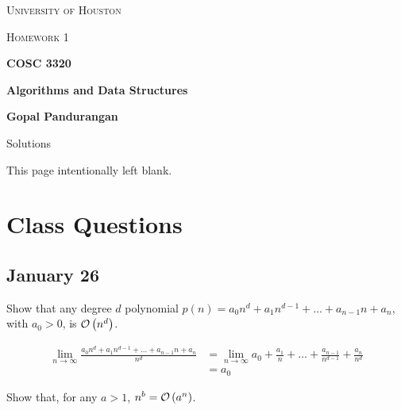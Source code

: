 \documentclass[draft]{article}
\begin{document}
\begin{titlepage}
    \begin{center}
        {\scshape\LARGE University of Houston\par}
        \vspace{1cm}
        {\scshape\Large Homework 1 \par}
        \vspace{1.5cm}
        {\huge\bfseries COSC 3320 \par}
        {\huge\bfseries Algorithms and Data Structures \par}
        \vspace{0.5cm}
        {\large\bfseries Gopal Pandurangan\par}
        \vspace{2cm}
        {\Large Solutions\par}
    \end{center}
\end{titlepage}
\vspace*{\fill}\begin{center}{\Huge This page intentionally left blank.}\end{center}\vspace*{\fill}\thispagestyle{empty}\clearpage
{}

\section{Class Questions}
\subsection{January 26}

\begin{question}
    Show that any degree $d$ polynomial $p(n) = a_0n^d + a_1n^{d - 1} + \dots + a_{n-1}n + a_n$, with $a_0 > 0$, is $\mathcal{O}\left(n^d\right)$.
\end{question}

\begin{solution}
    \begin{align*}\lim_{n\to\infty}\frac{a_0n^d + a_1n^{d - 1} + \dots + a_{n-1}n + a_n}{n^d}
         & =\lim_{n\to\infty}a_0 + \frac{a_1}{n} + \dots + \frac{a_{n-1}}{n^{d-1}} + \frac{a_n}{n^d} \\
         & = a_0
    \end{align*}
\end{solution}

\begin{question}
    Show that, for any $a > 1$, $n^b = \mathcal{O}\left(a^n\right)$.
\end{question}
\end{document}

